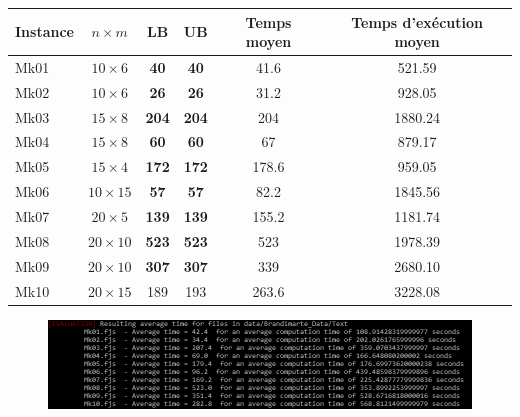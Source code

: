\begin{table}[!h]
    \renewcommand{\arraystretch}{1.5}
    \centering
    \begin{tabular}{p{} c c c c c}
        Instance & $n \times m$ & LB & UB & Temps moyen & Temps d'exécution moyen \\
         \hline
        Mk01 & $10 \times 6$ & \textbf{40} & \textbf{40} & 41.6 & 521.59 \\
         \hline
        Mk02 & $10 \times 6$ & \textbf{26} & \textbf{26} & 31.2 & 928.05 \\
         \hline
        Mk03 & $15 \times 8$ & \textbf{204} & \textbf{204} & 204 & 1880.24 \\
         \hline
        Mk04 & $15 \times 8$ & \textbf{60} & \textbf{60} & 67 & 879.17 \\
         \hline
        Mk05 & $15 \times 4$ & \textbf{172} & \textbf{172} & 178.6 & 959.05 \\
         \hline
        Mk06 & $10 \times 15$ & \textbf{57} & \textbf{57} & 82.2 & 1845.56 \\
         \hline
        Mk07 & $20 \times 5$ & \textbf{139} & \textbf{139} & 155.2 & 1181.74 \\
         \hline
        Mk08 & $20 \times 10$ & \textbf{523} & \textbf{523} & 523 & 1978.39 \\
         \hline
        Mk09 & $20 \times 10$ & \textbf{307} & \textbf{307} & 339 & 2680.10 \\
         \hline
        Mk10 & $20 \times 15$ & 189 & 193 & 263.6 & 3228.08 \\
         \hline 
    \end{tabular}
\end{table}

\begin{figure}[!h]
    \centering
    \includegraphics[width=\linewidth]{report/Pictures/brandimarte_200_500.png}
\end{figure}